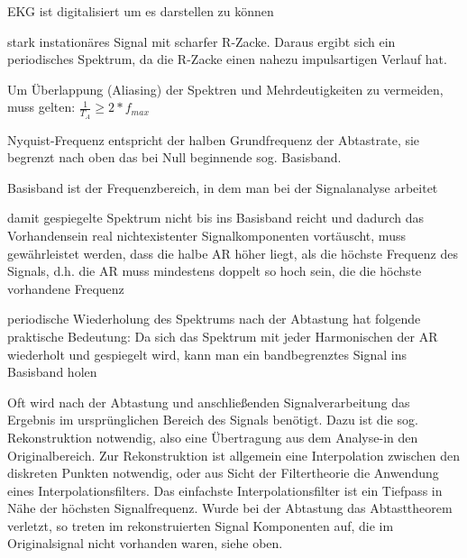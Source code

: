 \documentclass[a4paper]{article}
\begin{document}
\begin{multicols}{3}
  \begin{itemize*}
    \item EKG ist digitalisiert um es darstellen zu können
    \item stark instationäres Signal mit scharfer R-Zacke. Daraus ergibt sich ein periodisches Spektrum, da die R-Zacke einen nahezu impulsartigen Verlauf hat.
    \item Um Überlappung (Aliasing) der Spektren und Mehrdeutigkeiten zu vermeiden, muss gelten: $\frac{1}{T_A}\geq 2*f_{max}$
    \item Nyquist-Frequenz entspricht der halben Grundfrequenz der Abtastrate, sie begrenzt nach oben das bei Null beginnende sog. Basisband. 
    \item Basisband ist der Frequenzbereich, in dem man bei der Signalanalyse arbeitet
    \item damit gespiegelte Spektrum nicht bis ins Basisband reicht und dadurch das Vorhandensein real nichtexistenter Signalkomponenten vortäuscht, muss gewährleistet werden, dass die halbe AR höher liegt, als die höchste Frequenz des Signals, d.h. die AR muss mindestens doppelt so hoch sein, die die höchste vorhandene Frequenz
    \item periodische Wiederholung des Spektrums nach der Abtastung hat folgende praktische Bedeutung: Da sich das Spektrum mit jeder Harmonischen der AR wiederholt und gespiegelt wird, kann man ein bandbegrenztes Signal ins Basisband holen
  \end{itemize*}

  Oft wird nach der Abtastung und anschließenden Signalverarbeitung das Ergebnis im ursprünglichen Bereich des Signals benötigt. Dazu ist die sog. Rekonstruktion notwendig, also eine Übertragung aus dem Analyse-in den Originalbereich. Zur Rekonstruktion ist allgemein eine Interpolation zwischen den diskreten Punkten notwendig, oder aus Sicht der Filtertheorie die Anwendung eines Interpolationsfilters. Das einfachste Interpolationsfilter ist ein Tiefpass in Nähe der höchsten Signalfrequenz. Wurde bei der Abtastung das Abtasttheorem verletzt, so treten im rekonstruierten Signal Komponenten auf, die im Originalsignal nicht vorhanden waren, siehe oben.


\end{multicols}
\end{document}
